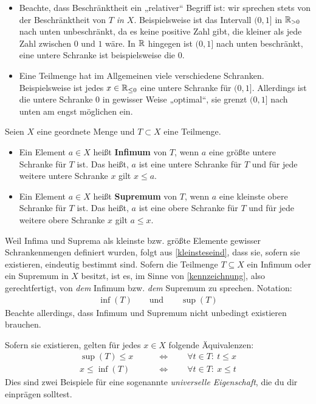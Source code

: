 \begin{bem} \quad
    \begin{itemize}
        \item Beachte, dass Beschränktheit ein „relativer“ Begriff ist: wir sprechen stets von der Beschränktheit von $T$ \emph{in $X$}. Beispielsweise ist das Intervall $(0,1]$ in $\mathbb R_{>0}$ nach unten unbeschränkt, da es keine positive Zahl gibt, die kleiner als jede Zahl zwischen $0$ und $1$ wäre. In $\mathbb R$ hingegen ist $(0,1]$ nach unten beschränkt, eine untere Schranke ist beispielsweise die $0$.
        \item Eine Teilmenge hat im Allgemeinen viele verschiedene Schranken. Beispielsweise ist jedes $x\in \mathbb R_{\le 0}$ eine untere Schranke für $(0,1]$. Allerdings ist die untere Schranke $0$ in gewisser Weise „optimal“, sie grenzt $(0,1]$ nach unten am engst möglichen ein.
    \end{itemize}
\end{bem}


\begin{defin}  
    Seien $X$ eine geordnete Menge und $T\subset X$ eine Teilmenge.
    \begin{itemize}
        \item Ein Element $a\in X$ heißt \textbf{Infimum} von $T$, wenn $a$ eine größte untere Schranke für $T$ ist. Das heißt, $a$ ist eine untere Schranke für $T$ und für jede weitere untere Schranke $x$ gilt $x\le a$.
        \item Ein Element $a\in X$ heißt \textbf{Supremum} von $T$, wenn $a$ eine kleinste obere Schranke für $T$ ist. Das heißt, $a$ ist eine obere Schranke für $T$ und für jede weitere obere Schranke $x$ gilt $a\le x$.
    \end{itemize}
\end{defin}


\begin{nota}
    Weil Infima und Suprema als kleinste bzw. größte Elemente gewisser Schrankenmengen definiert wurden, folgt aus \cref{kleinsteseind}, dass sie, sofern sie existieren, eindeutig bestimmt sind. Sofern die Teilmenge $T\subseteq X$ ein Infimum oder ein Supremum in $X$ besitzt, ist es, im Sinne von \cref{kennzeichnung}, also gerechtfertigt, von \emph{dem} Infimum bzw. \emph{dem} Supremum zu sprechen. Notation:
    \begin{align*}
        \inf(T) \qquad\text{und}\qquad \sup(T)
    \end{align*}
    Beachte allerdings, dass Infimum und Supremum nicht unbedingt existieren brauchen.

    Sofern sie existieren, gelten für jedes $x\in X$ folgende Äquivalenzen:
    \begin{align*}
        \sup(T)\le x \qquad&\Leftrightarrow\qquad \forall t\in T:\ t\le x \\
        x\le \inf(T) \qquad&\Leftrightarrow\qquad \forall t\in T:\ x\le t
    \end{align*}
    Dies sind zwei Beispiele für eine sogenannte \emph{universelle Eigenschaft}, die du dir einprägen solltest.
\end{nota}


